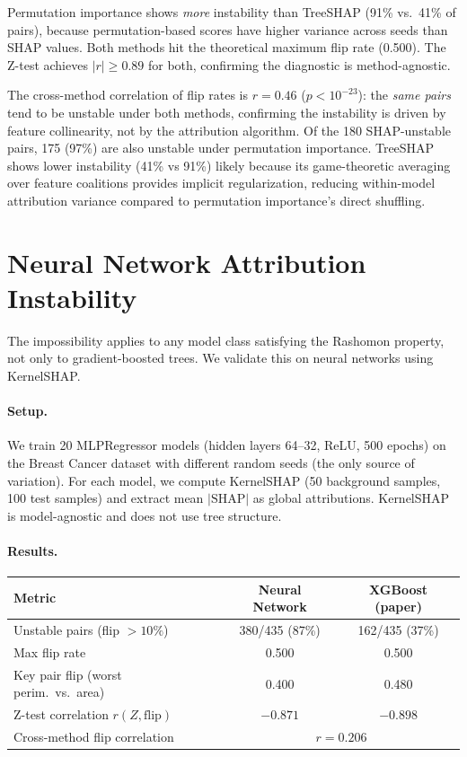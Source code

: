 \documentclass{article}
\begin{document}
Permutation importance shows \emph{more} instability than TreeSHAP
(91\% vs.\ 41\% of pairs), because permutation-based scores have
higher variance across seeds than SHAP values. Both methods hit the
theoretical maximum flip rate (0.500). The Z-test achieves
$|r| \geq 0.89$ for both, confirming the diagnostic is method-agnostic.

The cross-method correlation of flip rates is $r = 0.46$
($p < 10^{-23}$): the \emph{same pairs} tend to be unstable under
both methods, confirming the instability is driven by feature
collinearity, not by the attribution algorithm. Of the 180
SHAP-unstable pairs, 175 (97\%) are also unstable under permutation
importance. TreeSHAP shows lower instability (41\% vs 91\%) likely
because its game-theoretic averaging over feature coalitions provides
implicit regularization, reducing within-model attribution variance
compared to permutation importance's direct shuffling.

\section{Neural Network Attribution Instability}

The impossibility applies to any model class satisfying the Rashomon
property, not only to gradient-boosted trees. We validate this on
neural networks using KernelSHAP.

\paragraph{Setup.}
We train 20 MLPRegressor models (hidden layers 64--32, ReLU, 500 epochs)
on the Breast Cancer dataset with different random seeds (the only source
of variation). For each model, we compute KernelSHAP (50 background
samples, 100 test samples) and extract mean $|\text{SHAP}|$ as global
attributions. KernelSHAP is model-agnostic and does not use tree
structure.

\paragraph{Results.}

\begin{center}
\small
\begin{tabular}{@{}lcc@{}}
\toprule
Metric & Neural Network & XGBoost (paper) \\
\midrule
Unstable pairs (flip $> 10\%$) & 380/435 (87\%) & 162/435 (37\%) \\
Max flip rate & 0.500 & 0.500 \\
Key pair flip (worst perim.\ vs.\ area) & 0.400 & 0.480 \\
Z-test correlation $r(Z, \text{flip})$ & $-0.871$ & $-0.898$ \\
Cross-method flip correlation & \multicolumn{2}{c}{$r = 0.206$} \\
\bottomrule
\end{tabular}
\end{center}
\end{document}

